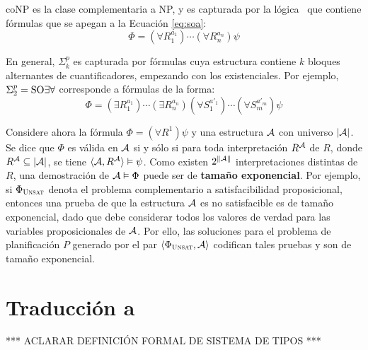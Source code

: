 coNP es la clase complementaria a NP, y es capturada por la lógica \SOA\ 
que contiene fórmulas que se apegan a la Ecuación \ref{eq:soa}:
\begin{equation}
\label{eq:soa}
\Phi = (\forall R_1^{a_1})\cdots(\forall R_n^{a_n})\psi
\end{equation}

En general, $\Sigma^p_k$ es capturada por fórmulas cuya estructura contiene $k$
bloques alternantes de cuantificadores, empezando con los existenciales. Por
ejemplo, $\Sigma^p_2=\text{SO}\exists\forall$ corresponde a fórmulas de la forma:
\begin{equation}
\Phi = (\exists R_1^{a_1}) \cdots (\exists R_n^{a_n}) 
       (\forall S_1^{a'_1}) \cdots (\forall S_m^{a'_m})
       \psi
\end{equation}

%

Considere ahora la fórmula $\Phi=(\forall R^1)\psi$
y una estructura $\mathcal{A}$ con universo $|\mathcal{A}|$.
Se dice que $\Phi$ es válida en $\mathcal{A}$ si y sólo si para toda
interpretación $R^{\mathcal{A}}$ de $R$, donde $R^{\mathcal{A}} \subseteq |\mathcal{A}|$, se tiene
$\langle \mathcal{A},R^{\mathcal{A}} \rangle\vDash\psi$. Como existen $2^{\|\mathcal{A}\|}$ interpretaciones
distintas de $R$, una demostración de $\mathcal{A}\vDash\Phi$ puede ser de
\textbf{tamaño exponencial}. Por ejemplo, si $\Phi_{\textsc{Unsat}}$ denota el problema
complementario a satisfacibilidad proposicional, entonces una prueba de que la
estructura $\mathcal{A}$ es no satisfacible es de tamaño exponencial, dado que debe
considerar todos los valores de verdad para las variables proposicionales de
$\mathcal{A}$. Por ello, las soluciones para el problema de planificación $P$ generado
por el par $\langle \Phi_{\textsc{Unsat}},\mathcal{A} \rangle$ codifican tales pruebas y son de tamaño
exponencial.

\section{Traducción a \STRIPS}

*** ACLARAR DEFINICIÓN FORMAL DE SISTEMA DE TIPOS ***
